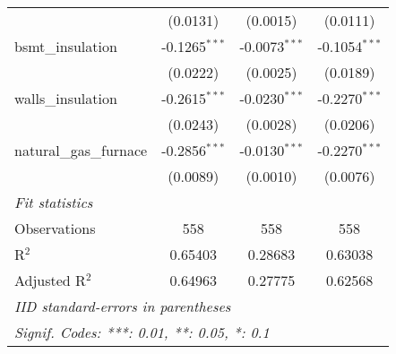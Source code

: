 \begin{tabular}{lccc}
                           & (0.0131)                                                                 & (0.0015)                                                                    & (0.0111)\\
   bsmt\_insulation       & -0.1265$^{***}$                                                          & -0.0073$^{***}$                                                             & -0.1054$^{***}$\\
                           & (0.0222)                                                                 & (0.0025)                                                                    & (0.0189)\\
   walls\_insulation      & -0.2615$^{***}$                                                          & -0.0230$^{***}$                                                             & -0.2270$^{***}$\\
                           & (0.0243)                                                                 & (0.0028)                                                                    & (0.0206)\\
   natural\_gas\_furnace & -0.2856$^{***}$                                                          & -0.0130$^{***}$                                                             & -0.2270$^{***}$\\
                           & (0.0089)                                                                 & (0.0010)                                                                    & (0.0076)\\
   \midrule \emph{Fit statistics} &   &   &  \\
   Observations            & 558                                                                      & 558                                                                         & 558\\
   R$^2$                   & 0.65403                                                                  & 0.28683                                                                     & 0.63038\\
   Adjusted R$^2$          & 0.64963                                                                  & 0.27775                                                                     & 0.62568\\
   \midrule\midrule\multicolumn{4}{l}{\emph{IID standard-errors in parentheses}}\\
   \multicolumn{4}{l}{\emph{Signif. Codes: ***: 0.01, **: 0.05, *: 0.1}}\\
\end{tabular}


